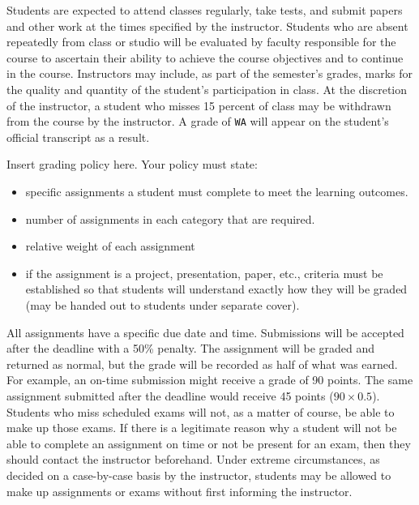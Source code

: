 \documentclass{wit_syllabus}
\begin{document}
Students are expected to attend classes regularly, take tests, and submit papers and other work at the times specified by the instructor. 
Students who are absent repeatedly from class or studio will be evaluated by faculty responsible for the course to ascertain their ability to achieve the course objectives and to continue in the course.  
Instructors may include, as part of the semester's grades, marks for the quality and quantity of the student's participation in class.  
At the discretion of the instructor, a student who misses 15 percent of class may be withdrawn from the course by the instructor. 
A grade of \texttt{WA} will appear on the student's official transcript as a result.

Insert grading policy here.  Your policy must state:
\begin{itemize}
\item specific assignments a student must complete to meet the learning outcomes.
\item number of assignments in each category that are required.
\item relative weight of each assignment
\item if the assignment is a project, presentation, paper, etc., criteria must be established so that students will understand exactly how they will be graded (may be handed out to students under separate cover).
\end{itemize}

\SyllabusGradingSystem

\SyllabusDropAdd



All assignments have a specific due date and time.  
Submissions will be accepted after the deadline with a 50\% penalty.  
The assignment will be graded and returned as normal, but the grade will be recorded as half of what was earned.  
For example, an on-time submission might receive a grade of 90 points.  
The same assignment submitted after the deadline would receive 45 points ($90 \times 0.5$).  
\\

Students who miss scheduled exams will not, as a matter of course, be able to make up those exams.  
If there is a legitimate reason why a student will not be able to complete an assignment on time or not be present for an exam, then they should contact the instructor beforehand.  
Under extreme circumstances, as decided on a case-by-case basis by the instructor, students may be allowed to make up assignments or exams without first informing the instructor.
\end{document}
